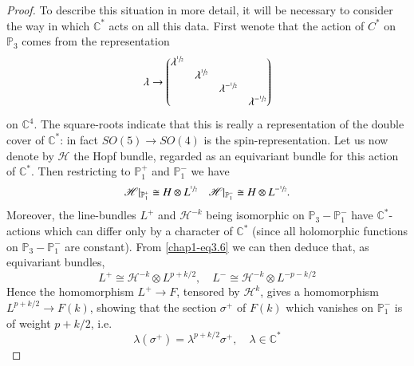 \begin{proof}
To describe this situation in more detail, it will be necessary to
consider the way in which $\mathbb{C}^{*}$ acts on all this
data. First we\pageoriginale note that the action of $C^{*}$ on
$\mathbb{P}_{3}$ comes from the representation
$$
\lambda\to
\begin{pmatrix}
\lambda^{\sfrac{1}{2}} & & & \\
& \lambda^{\sfrac{1}{2}} & & \\
& & \lambda^{-\sfrac{1}{2}} &\\
&&& \lambda^{-\sfrac{1}{2}}
\end{pmatrix}
$$
on $\mathbb{C}^{4}$. The square-roots indicate that this is really a
representation of the double cover of $\mathbb{C}^{*}$: in fact
$SO(5)\to SO(4)$ is the spin-representation. Let us now denote by
$\mathscr{H}$ the Hopf bundle, regarded as an equivariant bundle for
this action of $\mathbb{C}^{*}$. Then restricting to
$\mathbb{P}^{+}_{1}$ and $\mathbb{P}^{-}_{1}$ we have
\begin{equation}
\mathscr{H}|_{\mathbb{P}^{+}_{1}}\cong H\otimes L^{\sfrac{1}{2}}\quad
\mathscr{H}|_{\mathbb{P}_{1}^{-}}\cong H\otimes
L^{-\sfrac{1}{2}}.\label{chap1-eq3.6} 
\end{equation}
Moreover, the line-bundles $L^{+}$ and $\mathscr{H}^{-k}$ being
isomorphic on $\mathbb{P}_{3}-\mathbb{P}^{-}_{1}$ have
$\mathbb{C}^{*}$-actions which can differ only by a character of
$\mathbb{C}^{*}$ (since all holomorphic functions on
$\mathbb{P}_{3}-\mathbb{P}^{-}_{1}$ are constant). From
\eqref{chap1-eq3.6} we can then deduce that, as equivariant bundles,
\begin{equation}
L^{+}\cong \mathscr{H}^{-k}\otimes L^{p+k/2},\quad L^{-}\cong
\mathscr{H}^{-k}\otimes L^{-p-k/2}\label{chap1-eq3.7}
\end{equation}
Hence the homomorphism $L^{+}\to F$, tensored by $\mathscr{H}^{k}$,
gives a homomorphism $L^{p+k/2}\to F(k)$, showing that the section
$\sigma^{+}$ of $F(k)$ which vanishes on $\mathbb{P}^{-}_{1}$ is of
weight $p+k/2$, i.e.
\begin{equation}
\lambda(\sigma^{+})=\lambda^{p+k/2}\sigma^{+},\quad
\lambda\in\mathbb{C}^{*}\label{chap1-eq3.8} 
\end{equation}


\end{proof}
